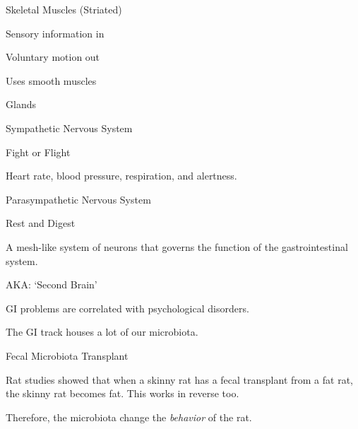 \begin{coloredlist}
    \item {}
    \begin{coloredlist}
        \item Skeletal Muscles (Striated)
        \item Sensory information in
        \item Voluntary motion out
    \end{coloredlist}
    \item {}
    \begin{coloredlist}
        \item Uses smooth muscles
        \item Glands
        \item Sympathetic Nervous System
        \begin{coloredlist}
            \item Fight or Flight
            \item Heart rate, blood pressure, respiration, and alertness.
        \end{coloredlist}
        \item Parasympathetic Nervous System
        \begin{coloredlist}
            \item Rest and Digest
        \end{coloredlist}
        \item {}
        \begin{coloredlist}
            \item A mesh-like system of neurons that governs the function of the gastrointestinal system.
            \item AKA: `Second Brain'
            \item GI problems are correlated with psychological disorders.
            \item The GI track houses a lot of our microbiota.
            \item Fecal Microbiota Transplant
            \begin{coloredlist}
                \item Rat studies showed that when a skinny rat has a fecal transplant from a fat rat, the skinny rat becomes fat. This works in reverse too.
                \item Therefore, the microbiota change the \textit{behavior} of the rat.
            \end{coloredlist}

\end{coloredlist}
\end{coloredlist}
\end{coloredlist}
